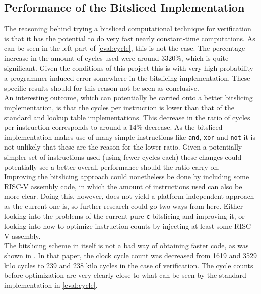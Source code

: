 \subsection{Performance of the Bitsliced Implementation}
The reasoning behind trying a bitsliced computational technique for verification is that it has the potential to do very fast nearly constant-time computations. As can be seen in the left part of \cref{eval:cycle}, this is not the case. The percentage increase in the amount of cycles used were around 3320\%, which is quite significant. Given the conditions of this project this is with very high probability a programmer-induced error somewhere in the bitslicing implementation. These specific results should for this reason not be seen as conclusive.
\medskip\\
An interesting outcome, which can potentially be carried onto a better bitslicing implementation, is that the cycles per instruction is lower than that of the standard and lookup table implementations. This decrease in the ratio of cycles per instruction corresponds to around a 14\% decrease. As the bitsliced implementation makes use of many simple instructions like \texttt{and}, \texttt{xor} and \texttt{not} it is not unlikely that these are the reason for the lower ratio. Given a potentially simpler set of instructions used (using fewer cycles each) these changes could potentially see a better overall performance should the ratio carry on.
\medskip\\
Improving the bitslicing approach could nonetheless be done by including some RISC-V assembly code, in which the amount of instructions used can also be more clear. Doing this, however, does not yield a platform independent approach as the current one is, so further research could go two ways from here. Either looking into the problems of the current pure \texttt{c} bitslicing and improving it, or looking into how to optimize instruction counts by injecting at least some RISC-V assembly.
\medskip\\
The bitslicing scheme in itself is not a bad way of obtaining faster code, as was shown in \cite{betterbitslicer}. In that paper, the clock cycle count was decreased from 1619 and 3529 kilo cycles to 239 and 238 kilo cycles in the case of verification. The cycle counts before optimization are very clearly close to what can be seen by the standard implementation in \cref{eval:cycle}.
